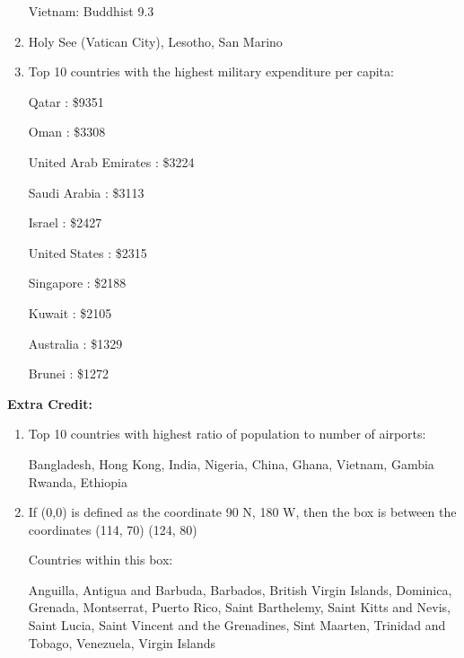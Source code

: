 \documentclass[letterpaper]{article}
\begin{document}
\begin{enumerate}
Vietnam: Buddhist 9.3%

\newpage
\item Holy See (Vatican City),
Lesotho,
San Marino

\item Top 10 countries with the highest military expenditure per capita:

Qatar : \$9351

Oman : \$3308

United Arab Emirates : \$3224

Saudi Arabia : \$3113

Israel : \$2427

United States : \$2315

Singapore : \$2188

Kuwait : \$2105

Australia : \$1329

Brunei : \$1272
\end{enumerate}

\textbf{Extra Credit:}
\begin{enumerate}
\item Top 10 countries with highest ratio of population to number of airports:

Bangladesh,
Hong Kong,
India,
Nigeria,
China,
Ghana,
Vietnam,
Gambia
Rwanda,
Ethiopia

\item 
If (0,0) is defined as the coordinate 90 N, 180 W, 
 then the box is between the coordinates 
(114, 70)
(124, 80)

Countries within this box:

Anguilla,
Antigua and Barbuda,
Barbados,
British Virgin Islands,
Dominica,
Grenada,
Montserrat,
Puerto Rico,
Saint Barthelemy,
Saint Kitts and Nevis,
Saint Lucia,
Saint Vincent and the Grenadines,
Sint Maarten,
Trinidad and Tobago,
Venezuela,
Virgin Islands

\end{enumerate}
\end{document}
